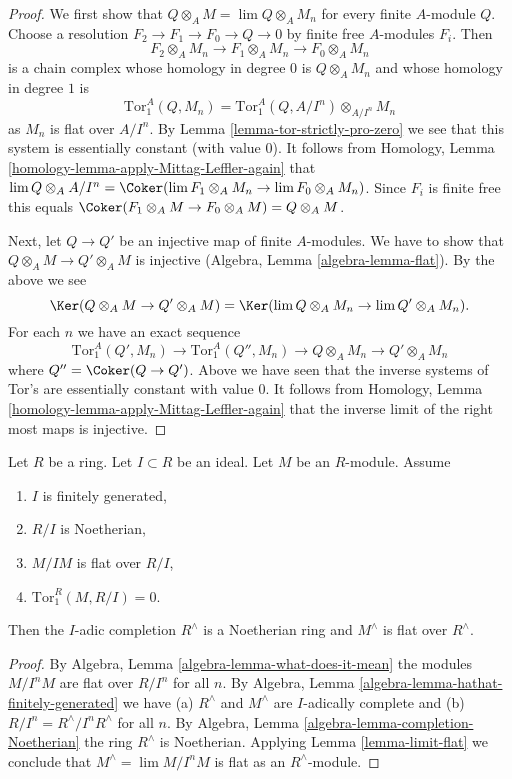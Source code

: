 \begin{proof}
We first show that $Q \otimes_A M = \lim Q \otimes_A M_n$ for every finite
$A$-module $Q$. Choose a resolution $F_2 \to F_1 \to F_0 \to Q \to 0$
by finite free $A$-modules $F_i$. Then
$$
F_2 \otimes_A M_n \to F_1 \otimes_A M_n \to F_0 \otimes_A M_n
$$
is a chain complex whose homology in degree $0$ is $Q \otimes_A M_n$
and whose homology in degree $1$ is
$$
\text{Tor}_1^A(Q, M_n) = \text{Tor}_1^A(Q, A/I^n) \otimes_{A/I^n} M_n
$$
as $M_n$ is flat over $A/I^n$. By Lemma \ref{lemma-tor-strictly-pro-zero}
we see that this system is essentially constant (with value $0$).
It follows from Homology, Lemma \ref{homology-lemma-apply-Mittag-Leffler-again}
that $\lim Q \otimes_A A/I^n =
\Coker(\lim F_1 \otimes_A M_n \to \lim F_0 \otimes_A M_n)$.
Since $F_i$ is finite free this equals
$\Coker(F_1 \otimes_A M \to F_0 \otimes_A M) = Q \otimes_A M$.

\medskip\noindent
Next, let $Q \to Q'$ be an injective map of finite $A$-modules.
We have to show that $Q \otimes_A M \to Q' \otimes_A M$ is injective
(Algebra, Lemma \ref{algebra-lemma-flat}). By the above we see
$$
\Ker(Q \otimes_A M \to Q' \otimes_A M) =
\Ker(\lim Q \otimes_A M_n \to \lim Q' \otimes_A M_n).
$$
For each $n$ we have an exact sequence
$$
\text{Tor}_1^A(Q', M_n) \to \text{Tor}_1^A(Q'', M_n) \to
Q \otimes_A M_n \to Q' \otimes_A M_n
$$
where $Q'' = \Coker(Q \to Q')$. Above we have seen that the
inverse systems of Tor's are essentially constant with value $0$.
It follows from
Homology, Lemma \ref{homology-lemma-apply-Mittag-Leffler-again}
that the inverse limit of the right most maps is injective.
\end{proof}

\begin{lemma}
\label{lemma-flat-after-completion}
Let $R$ be a ring. Let $I \subset R$ be an ideal. Let $M$ be
an $R$-module. Assume
\begin{enumerate}
\item $I$ is finitely generated,
\item $R/I$ is Noetherian,
\item $M/IM$ is flat over $R/I$,
\item $\text{Tor}_1^R(M, R/I) = 0$.
\end{enumerate}
Then the $I$-adic completion $R^\wedge$
is a Noetherian ring and $M^\wedge$ is flat over $R^\wedge$.
\end{lemma}

\begin{proof}
By Algebra, Lemma \ref{algebra-lemma-what-does-it-mean}
the modules $M/I^nM$ are flat over $R/I^n$ for all $n$.
By Algebra, Lemma \ref{algebra-lemma-hathat-finitely-generated} we have
(a) $R^\wedge$ and $M^\wedge$ are $I$-adically complete and
(b) $R/I^n = R^\wedge/I^nR^\wedge$ for all $n$.
By Algebra, Lemma \ref{algebra-lemma-completion-Noetherian}
the ring $R^\wedge$ is Noetherian.
Applying Lemma \ref{lemma-limit-flat} we conclude that
$M^\wedge = \lim M/I^nM$ is flat as an $R^\wedge$-module.
\end{proof}









